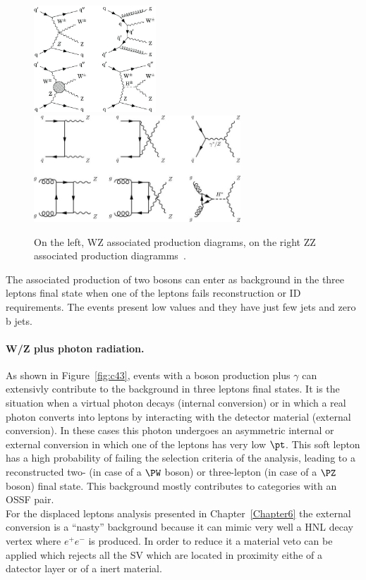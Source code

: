 \begin{figure}[h!]
\centering
  \includegraphics[height = 4cm]{Figures/c4/dia/WZjj-production.jpeg}
\hspace{1cm}
  \includegraphics[height = 4cm]{Figures/c4/dia/Lowest-order-Feynman-diagrams-for-ZZ-production.jpeg}
  \caption{On the left, WZ associated production diagrams, on the
    right ZZ associated production diagramms~\cite{diagram}.}
  \label{fig:c41}
\end{figure}
The associated production of two \PZ bosons can enter as background in
the three leptons final state when one of the leptons fails
reconstruction or ID requirements. The events present low \ptmiss
values and they have just few jets and zero b jets. 


\paragraph{W/Z plus photon radiation.}\label{sec:c4photon}
As shown in Figure~\ref{fig:c43}, events with a boson production plus
$\gamma$ can extensivly contribute to the background in three leptons
final states. It is the situation when a virtual photon decays (internal conversion) or in which a real photon
converts into leptons by interacting with the detector material
(external conversion). In these cases this photon undergoes an
asymmetric internal or external conversion in which one of the leptons
has very low $\pt$. This soft lepton has a high probability of failing
the selection criteria of the analysis, leading to a reconstructed
two- (in case of a $\PW$ boson) or three-lepton (in case of a $\PZ$
boson) final state. This background mostly contributes to categories
with an OSSF pair.\\
For the displaced leptons analysis presented in Chapter~\ref{Chapter6}
the external conversion is a ``nasty'' background because it can mimic
very well a HNL decay vertex where $e^{+}e^{-}$ is produced. In order
to reduce it a material veto can be applied which rejects all the SV
which are located in proximity eithe of a datector layer or of a inert material.

